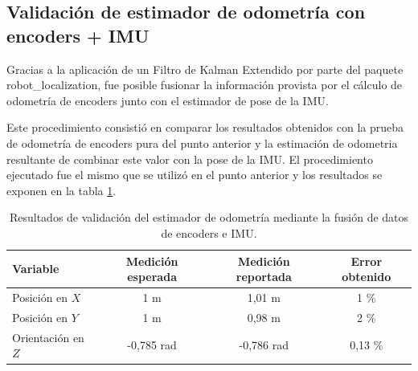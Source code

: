 

\subsection{Validación de estimador de odometría con encoders + IMU}

Gracias a la aplicación de un Filtro de Kalman Extendido por parte del paquete robot\_localization, fue posible fusionar la información provista por el cálculo de odometría de encoders junto con el estimador de pose de la IMU.

Este procedimiento consistió en comparar los resultados obtenidos con la prueba de odometría de encoders pura del punto anterior y la estimación de odometria resultante de combinar este valor con la pose de la IMU. El procedimiento ejecutado fue el mismo que se utilizó en el punto anterior y los resultados se exponen en la tabla \ref{tab:odometriaFusion}.

\begin{table}[!htbp]
    \centering
    \caption[Fusión de odometría con IMU]{Resultados de validación del estimador de odometría mediante la fusión de datos de encoders e IMU.}
    \begin{tabular}{lccc}
        \toprule
        \textbf{Variable}  & \textbf{Medición esperada} & \textbf{Medición reportada} & \textbf{Error obtenido} \\
        \midrule
        Posición en $X$    & 1 m                        & 1,01 m                      & 1 \%                    \\
        Posición en $Y$    & 1 m                        & 0,98 m                      & 2 \%                    \\
        Orientación en $Z$ & -0,785 rad                 & -0,786 rad                  & 0,13 \%                 \\
        \bottomrule
        \hline
    \end{tabular}
    \label{tab:odometriaFusion}
\end{table}

